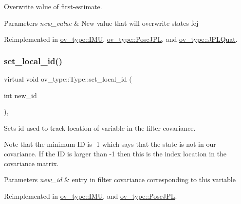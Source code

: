 Overwrite value of first-\/estimate. 


\begin{DoxyParams}{Parameters}
{\em new\+\_\+value} & New value that will overwrite state\textquotesingle{}s fej \\
\hline
\end{DoxyParams}


Reimplemented in \hyperlink{classov__type_1_1IMU_aadf4a83a2371984898ca8c6a339617ce}{ov\+\_\+type\+::\+I\+MU}, \hyperlink{classov__type_1_1PoseJPL_aa20a30cf44fefdb749565c0e60fe027a}{ov\+\_\+type\+::\+Pose\+J\+PL}, and \hyperlink{classov__type_1_1JPLQuat_ae631d6cf4ed4170234272be498fd22e3}{ov\+\_\+type\+::\+J\+P\+L\+Quat}.

\mbox{\label{classov__type_1_1Type_a52cb2fe6e25dbe8875da3fd618cf0b61}} 
\subsubsection{\texorpdfstring{set\+\_\+local\+\_\+id()}{set\_local\_id()}}
{\footnotesize\ttfamily virtual void ov\+\_\+type\+::\+Type\+::set\+\_\+local\+\_\+id (\begin{DoxyParamCaption}\item[{int}]{new\+\_\+id }\end{DoxyParamCaption})\hspace{0.3cm}{\ttfamily [inline]}, {\ttfamily [virtual]}}



Sets id used to track location of variable in the filter covariance. 

Note that the minimum ID is -\/1 which says that the state is not in our covariance. If the ID is larger than -\/1 then this is the index location in the covariance matrix.


\begin{DoxyParams}{Parameters}
{\em new\+\_\+id} & entry in filter covariance corresponding to this variable \\
\hline
\end{DoxyParams}


Reimplemented in \hyperlink{classov__type_1_1IMU_a9d4e915d474e8e13591a11a54ac7c969}{ov\+\_\+type\+::\+I\+MU}, and \hyperlink{classov__type_1_1PoseJPL_a2295d3fbdd9529c1464957961a886731}{ov\+\_\+type\+::\+Pose\+J\+PL}.

